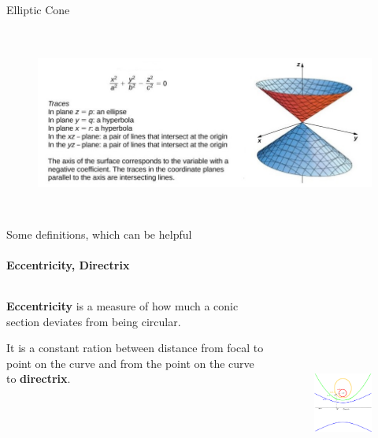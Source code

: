 \documentclass[aspectratio=169]{beamer}
\begin{document}
\begin{frame}[t]{Elliptic Cone}
\framesubtitle{}
    \vspace{-0.6cm}
    \begin{figure}[H]
        \centering\includegraphics[height=6cm,width=1\textwidth,keepaspectratio]{elliptic_cone.jpg}
        \label{fig:elliptic_cone.jpg}
    \end{figure}
\end{frame}

\begin{frame}[t]{Some definitions, which can be helpful}
\framesubtitle{Eccentricity, Directrix}
    \begin{columns}[T,onlytextwidth]
        \begin{column}{0.59\textwidth}
            \textbf{Eccentricity} is a measure of how much a conic section deviates from being circular. \medskip
        
            It is a constant ration between distance from focal to point on the curve and from the point on the curve to \textbf{directrix}.
        \end{column}
        \begin{column}{0.39\textwidth}
            \vspace{-1cm}
            \begin{figure}[H]
                    \centering\includegraphics[height=7cm,width=1\textwidth,keepaspectratio]{eccentricity.png}
                    \label{fig:eccentricity.png}
            \end{figure}
        \end{column}
    \end{columns}
\end{frame}
\end{document}
